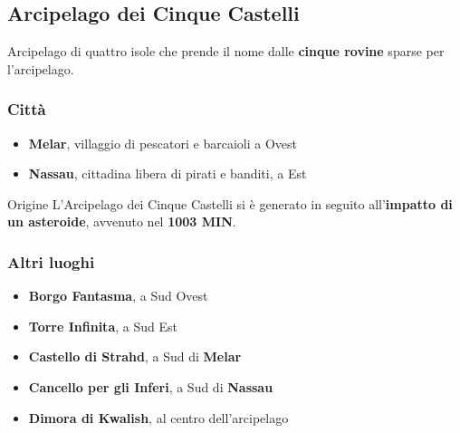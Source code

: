 \documentclass[10pt,twoside,onecolumn,openany]{book}
\begin{document}
\subsection{Arcipelago dei Cinque Castelli}
Arcipelago di quattro isole che prende il nome dalle \textbf{cinque rovine} sparse per l'arcipelago.
\begin{multicols}{2}
\subsubsection{Città}
\begin{itemize}
\item \textbf{Melar}, villaggio di pescatori e barcaioli a Ovest
\item \textbf{Nassau}, cittadina libera di pirati e banditi, a Est
\end{itemize}
\begin{commentbox}{{Origine}}
L'Arcipelago dei Cinque Castelli si è generato in seguito all'\textbf{impatto di un asteroide}, avvenuto nel \textbf{1003 MIN}.
\end{commentbox}
\columnbreak
\subsubsection{Altri luoghi}
\begin{itemize}
\item \textbf{Borgo Fantasma}, a Sud Ovest
\item \textbf{Torre Infinita}, a Sud Est
\item \textbf{Castello di Strahd}, a Sud di \textbf{Melar}
\item \textbf{Cancello per gli Inferi}, a Sud di \textbf{Nassau}
\item \textbf{Dimora di Kwalish}, al centro dell'arcipelago
\end{itemize}
\end{multicols}
\end{document}
